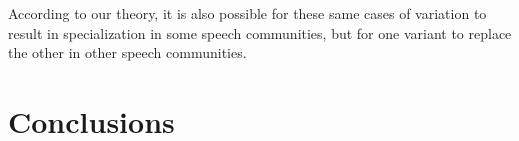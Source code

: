 According to our theory, it is also possible for these same cases of variation to result in specialization in some speech communities, but for one variant to replace the other in other speech communities.

\section{Conclusions}










%
%


